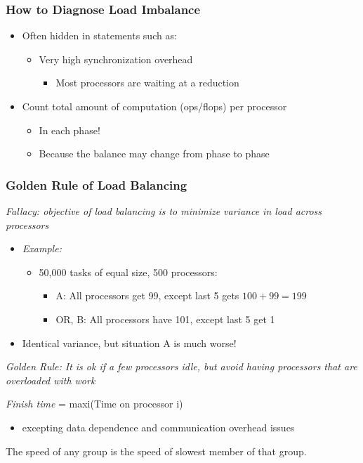 \begin{frame}[fragile]
\frametitle{How to Diagnose Load Imbalance}
\begin{itemize}
 \item Often hidden in statements such as:
 \begin{itemize}
  \item Very high synchronization overhead
  \begin{itemize}
   \item Most processors are waiting at a reduction
  \end{itemize}
 \end{itemize}
 \item Count total amount of computation (ops/flops) per processor
 \begin{itemize}
  \item In each phase! 
  \item Because the balance may change from phase to phase
 \end{itemize}
\end{itemize}
\end{frame}

\begin{frame}[fragile]
\frametitle{Golden Rule of Load Balancing}
\emph{Fallacy: objective of load balancing is to minimize variance in load across processors}

\begin{itemize}
 \item[]\emph{Example:}
 \begin{itemize}
  \item  50,000 tasks of equal size, 500  processors:
  \begin{itemize}
   \item A: All processors get 99, except last 5 gets $100+99 = 199$
   \item OR, B:  All processors have 101, except last 5 get 1
  \end{itemize}
 \end{itemize}
 \item[] Identical variance, but situation A is much worse!
\end{itemize}


\emph{Golden Rule: It is ok if a few processors idle, but avoid having processors that are overloaded with work}


\emph{Finish time} = maxi(Time on processor i)
\begin{itemize}
\item[] excepting data dependence and communication overhead issues
\end{itemize}

The speed of any group is the speed of slowest member of that group.
\end{frame}

